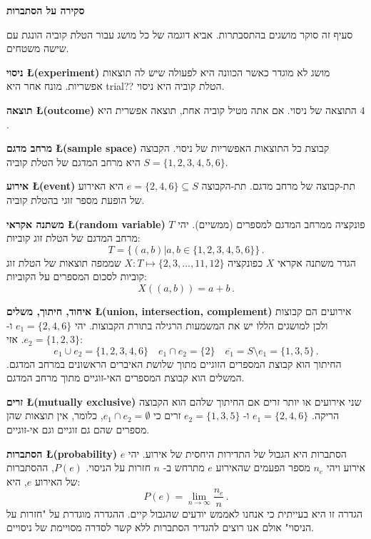 

\newpage

\begin{center}
\textbf{\LARGE סקירה על הסתברות}
\end{center}

סעיף זה סוקר מושגים בהתסבתרות. אביא דוגמה של כל מושג עבור הטלת קוביה הונגת עם שישה משטחים. 

\textbf{ניסוי \L{\small (experiment)}}
מושג לא מוגדר כאשר הכוונה היא לפעולה שיש לה תוצאות אפשריות. מונח אחר היא trial?? הטלת קוביה היא ניסוי.

\textbf{תוצאה \L{\small (outcome)}} 
התוצאה של ניסוי. אם אתה מטיל קוביה אחת, תוצאה אפשרית היא 
$4$.

\textbf{מרחב מדגם \L{\small (sample space)}}
קבוצת כל התוצאות האפשריות של ניסוי. הקבוצה 
$S=\{1,2,3,4,5,6\}$
היא מרחב המדגם של הטלת קוביה.

\textbf{אירוע \L{\small (event)}}
תת-קבוצה של מרחב מדגם. תת-הקבוצה 
$e=\{2,4,6\}\subseteq S$
היא האירוע של הופעת מספר זוגי בהטלת קוביה.

\textbf{משתנה אקראי \L{\small (random variable)}}
פונקציה ממרחב המדגם למספרים (ממשיים). יהי 
$T$
מרחב המדגם של הטלת זוג קוביות:
\[
T=\{(a,b)| a,b\in \{1,2,3,4,5,6\} \}\,.
\]
הגדר משתנה אקראי 
$X$
כפונקציה
$X:T \mapsto \{2,3,\ldots,11,12\}$
שממפה תוצאות של הטלת זוג קוביות לסכום המספרים על הקוביות:
\begin{equation}\label{eq.sum}
X((a,b)) = a+b\,.
\end{equation}

\textbf{איחוד, חיתוך, משלים \L{\small (union, intersection, complement)}} 
אירועים הם קבוצות ולכן למושגים הללו יש את המשמעות הרגילה בתורת הקבוצות. יהי
$e_1=\{2,4,6\}$
ו-%
$e_2=\{1,2,3\}$. 
אזי:
\[
e_1 \cup e_2=\{1,2,3,4,6\}\quad e_1 \cap e_2=\{2\}\quad \overline{e_1} = S\setminus e_1=\{1,3,5\}\,.
\]
החיתוך הוא קבוצת המספרים הזוגיים מתוך שלושת האיברים הראשונים במרחב המדגם. המשלים הוא קבוצת המספרים האי-זוגיים מתוך מרחב המדגם.

\textbf{זרים \L{\small (mutually exclusive)}} 
שני אירועים או יותר זרים אם החיתוך שלהם הוא הקבוצה הריקה.
$e_1=\{2,4,6\}$
ו-%
$e_2=\{1,3,5\}$
זרים כי
$e_1 \cap e_2=\emptyset$,
כלומר, אין תוצאות שהן מספרים שהם גם זוגיים וגם אי-זוגיים.

\textbf{הסתברות \L{\small (probability)}}
הסתברות היא הגבול של התדירות היחסית של אירוע. יהי
$e$ 
אירוע ויהי
$n_e$
מספר הפעמים שהאירוע 
$e$
מתרחש ב-%
$n$
חזרות על הניסוי. 
$P(e)$,
ההסתברות של האירוע
$e$,
היא:
\[
P(e) = \lim_{n\rightarrow \infty} \frac{n_e}{n}\,.
\]
הגדרה זו היא בעייתית כי אנחנו לאממש יודעים שהגבול קיים. ההגדרה מוגדרת על "חזרות על הניסוי" אולם אנו רוצים להגדיר הסתברות ללא קשר לסדרה מסויימת של ניסויים.

